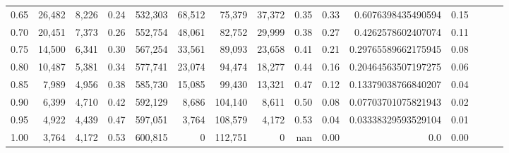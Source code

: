 \begin{tabular}{rrrrrrrrrrrrrrr}
0.65 &  26,482 &  8,226 &  0.24 &  532,303 &   68,512 &   75,379 &   37,372 &  0.35 &  0.33 &   0.6076398435490594 &      0.15 \\
0.70 &  20,451 &  7,373 &  0.26 &  552,754 &   48,061 &   82,752 &   29,999 &  0.38 &  0.27 &   0.4262578602407074 &      0.11 \\
0.75 &  14,500 &  6,341 &  0.30 &  567,254 &   33,561 &   89,093 &   23,658 &  0.41 &  0.21 &  0.29765589662175945 &      0.08 \\
0.80 &  10,487 &  5,381 &  0.34 &  577,741 &   23,074 &   94,474 &   18,277 &  0.44 &  0.16 &  0.20464563507197275 &      0.06 \\
0.85 &   7,989 &  4,956 &  0.38 &  585,730 &   15,085 &   99,430 &   13,321 &  0.47 &  0.12 &  0.13379038766840207 &      0.04 \\
0.90 &   6,399 &  4,710 &  0.42 &  592,129 &    8,686 &  104,140 &    8,611 &  0.50 &  0.08 &  0.07703701075821943 &      0.02 \\
0.95 &   4,922 &  4,439 &  0.47 &  597,051 &    3,764 &  108,579 &    4,172 &  0.53 &  0.04 &  0.03338329593529104 &      0.01 \\
1.00 &   3,764 &  4,172 &  0.53 &  600,815 &        0 &  112,751 &        0 &   nan &  0.00 &                  0.0 &      0.00 \\
\bottomrule
\end{tabular}
